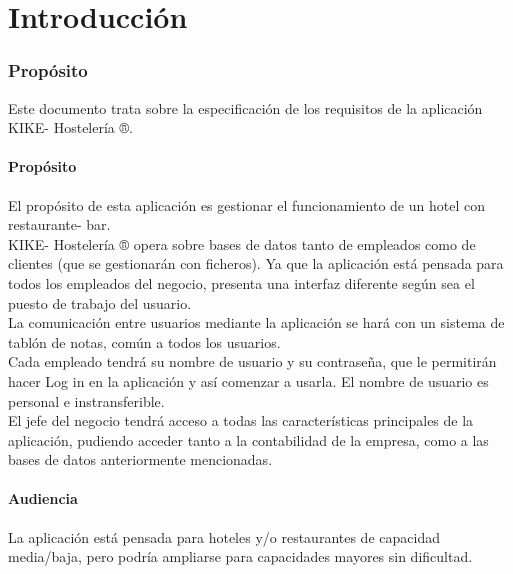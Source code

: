 \documentclass[spanish,a4paper,11pt, twoside]{report}	%
\begin{document}
\newpage
\mbox{}
\thispagestyle{empty}						%
\newpage


\tableofcontents 							%

\newpage
\mbox{}
\thispagestyle{empty}						%
\newpage


\part{Introducción}
\section{Propósito}
 	Este documento trata sobre la especificación de los requisitos de la aplicación KIKE- Hostelería ®.
		\subsection{Propósito} El propósito de esta aplicación es gestionar el funcionamiento de un hotel con restaurante- bar. \\

KIKE- Hostelería ® opera sobre bases de datos tanto de empleados como de clientes (que se gestionarán con ficheros). Ya que la aplicación está pensada para todos los empleados del negocio, presenta una interfaz diferente según sea el puesto de trabajo del usuario.\\

La comunicación entre usuarios mediante la aplicación se hará con un sistema de tablón de notas, común a todos los usuarios.\\

Cada empleado tendrá su nombre de usuario y su contraseña, que le permitirán hacer Log in en la aplicación y así comenzar a usarla. El nombre de usuario es personal e instransferible.\\

El jefe del negocio tendrá acceso a todas las características principales de la aplicación, pudiendo acceder tanto a la contabilidad de la empresa, como a las bases de datos anteriormente mencionadas. \\



		\subsection{Audiencia} La aplicación está pensada para hoteles y/o restaurantes de capacidad media/baja, pero podría ampliarse para capacidades mayores sin dificultad. \\
\end{document}
